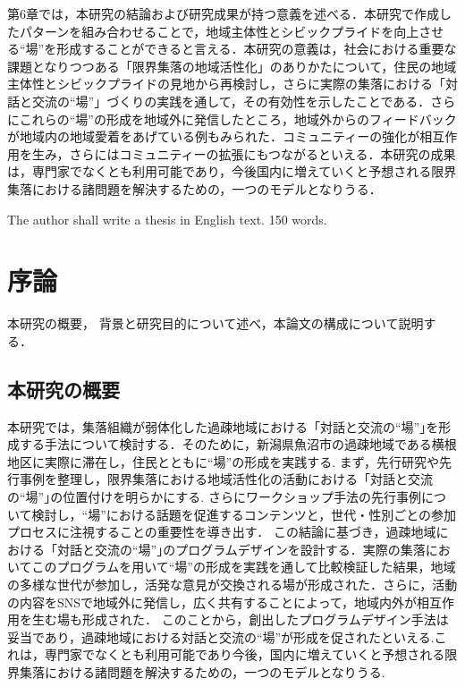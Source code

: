 \documentclass[a4paper]{jsarticle}
\begin{document}
 第6章では，本研究の結論および研究成果が持つ意義を述べる．本研究で作成したパターンを組み合わせることで，地域主体性とシビックプライドを向上させる“場”を形成することができると言える．本研究の意義は，社会における重要な課題となりつつある「限界集落の地域活性化」のありかたについて，住民の地域主体性とシビックプライドの見地から再検討し，さらに実際の集落における「対話と交流の“場”」づくりの実践を通して，その有効性を示したことである．さらにこれらの“場”の形成を地域外に発信したところ，地域外からのフィードバックが地域内の地域愛着をあげている例もみられた．コミュニティーの強化が相互作用を生み，さらにはコミュニティーの拡張にもつながるといえる．本研究の成果は，専門家でなくとも利用可能であり，今後国内に増えていくと予想される限界集落における諸問題を解決するための，一つのモデルとなりうる．





The author shall write a thesis in English text. 150 words.

\makemokuji


\newpage

\setcounter{page}{1} %
\section{序論}
本研究の概要， 背景と研究目的について述べ，本論文の構成について説明する．
\subsection{本研究の概要}
本研究では，集落組織が弱体化した過疎地域における「対話と交流の“場”｣を形成する手法について検討する．そのために，新潟県魚沼市の過疎地域である横根地区に実際に滞在し，住民とともに“場”の形成を実践する.
まず，先行研究や先行事例を整理し，限界集落における地域活性化の活動における「対話と交流の“場”｣の位置付けを明らかにする. さらにワークショップ手法の先行事例について検討し，“場”における話題を促進するコンテンツと，世代・性別ごとの参加プロセスに注視することの重要性を導き出す．
この結論に基づき，過疎地域における「対話と交流の“場”｣のプログラムデザインを設計する．実際の集落においてこのプログラムを用いて“場”の形成を実践を通して比較検証した結果，地域の多様な世代が参加し，活発な意見が交換される場が形成された．さらに，活動の内容をSNSで地域外に発信し，広く共有することによって，地域内外が相互作用を生む場も形成された．
このことから，創出したプログラムデザイン手法は妥当であり，過疎地域における対話と交流の“場”が形成を促されたといえる.これは，専門家でなくとも利用可能であり今後，国内に増えていくと予想される限界集落における諸問題を解決するための，一つのモデルとなりうる.
\end{document}
